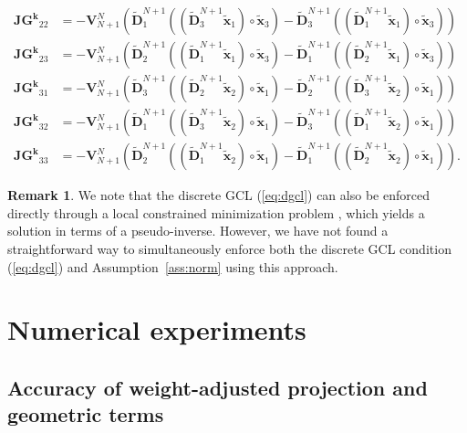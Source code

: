 \documentclass[preprint,10pt]{article}
\theoremstyle{definition}
\theoremstyle{lemma}
\newtheorem*{remark}{Remark}
\theoremstyle{theorem}
\theoremstyle{assumption}
\renewcommand{\tilde}{\widetilde}
\newcommand{\LRp}[1]{\left( #1 \right)}
\newcommand{\lcwnote}[1]{{\color{magenta}{#1}}}
\begin{document}
{\begin{align}
\bm{JG^k}_{22} &= -\bm{V}_{N+1}^N\LRp{\tilde{\bm{D}}^{N+1}_1 \LRp{ \LRp{\tilde{\bm{D}}^{N+1}_3\tilde{\bm{x}}_1} \circ\tilde{\bm{x}}_3} - \tilde{\bm{D}}^{N+1}_3 \LRp{ \LRp{\tilde{\bm{D}}^{N+1}_1\tilde{\bm{x}}_1 }\circ\tilde{\bm{x}}_3}} \nonumber\\
\bm{JG^k}_{23} &= -\bm{V}_{N+1}^N\LRp{\tilde{\bm{D}}^{N+1}_2 \LRp{ \LRp{\tilde{\bm{D}}^{N+1}_1\tilde{\bm{x}}_1} \circ\tilde{\bm{x}}_3} - \tilde{\bm{D}}^{N+1}_1 \LRp{ \LRp{\tilde{\bm{D}}^{N+1}_2\tilde{\bm{x}}_1 }\circ\tilde{\bm{x}}_3}} \nonumber\\
%
\bm{JG^k}_{31} &= -\bm{V}_{N+1}^N\LRp{\tilde{\bm{D}}^{N+1}_3 \LRp{ \LRp{\tilde{\bm{D}}^{N+1}_2 \tilde{\bm{x}}_2} \circ\tilde{\bm{x}}_1} - \tilde{\bm{D}}^{N+1}_2 \LRp{ \LRp{\tilde{\bm{D}}^{N+1}_3\tilde{\bm{x}}_2} \circ\tilde{\bm{x}}_1}} \nonumber\\
\bm{JG^k}_{32} &= -\bm{V}_{N+1}^N\LRp{\tilde{\bm{D}}^{N+1}_1 \LRp{ \LRp{\tilde{\bm{D}}^{N+1}_3\tilde{\bm{x}}_2} \circ\tilde{\bm{x}}_1} - \tilde{\bm{D}}^{N+1}_3 \LRp{  \LRp{\tilde{\bm{D}}^{N+1}_1\tilde{\bm{x}}_2 }\circ\tilde{\bm{x}}_1}} \nonumber\\
\bm{JG^k}_{33} &= -\bm{V}_{N+1}^N\LRp{\tilde{\bm{D}}^{N+1}_2 \LRp{ \LRp{\tilde{\bm{D}}^{N+1}_1\tilde{\bm{x}}_2} \circ\tilde{\bm{x}}_1} - \tilde{\bm{D}}^{N+1}_1 \LRp{  \LRp{\tilde{\bm{D}}^{N+1}_2\tilde{\bm{x}}_2 }\circ\tilde{\bm{x}}_1}}. \nonumber
\end{align}
\lcwnote{Should we instead use the average of the two ``conservative forms'' given earlier in the next?  I guess we would have to change the code as well.}
\begin{remark}

We note that the discrete GCL (\ref{eq:dgcl}) can also be enforced directly through a local constrained minimization problem \cite{fernandez2016simultaneous, crean2018entropy}, which yields a solution in terms of a pseudo-inverse.  However, we have not found a straightforward way to simultaneously enforce both the discrete GCL condition (\ref{eq:dgcl}) and Assumption~\ref{ass:norm} using this approach.
\end{remark}


\section{Numerical experiments}
\label{sec:num}

\subsection{Accuracy of weight-adjusted projection and geometric terms}

}
\end{document}
